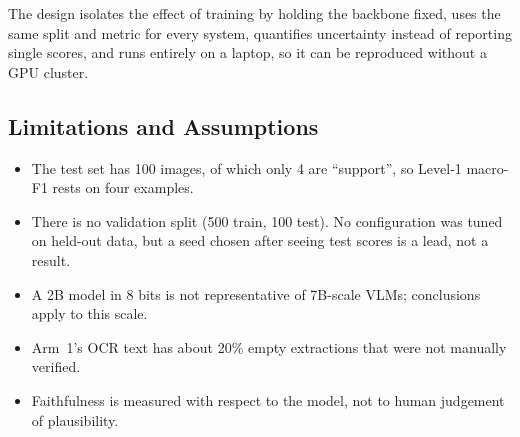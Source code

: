 The design isolates the effect of training by holding the backbone fixed, uses the same split and metric for every system, quantifies uncertainty instead of reporting single scores, and runs entirely on a laptop, so it can be reproduced without a GPU cluster.

\subsection{Limitations and Assumptions}

\begin{itemize}
    \item The test set has 100 images, of which only 4 are ``support'', so Level-1 macro-F1 rests on four examples.
    \item There is no validation split (500 train, 100 test). No configuration was tuned on held-out data, but a seed chosen after seeing test scores is a lead, not a result.
    \item A 2B model in 8 bits is not representative of 7B-scale VLMs; conclusions apply to this scale.
    \item Arm~1's OCR text has about 20\% empty extractions that were not manually verified.
    \item Faithfulness is measured with respect to the model, not to human judgement of plausibility.
\end{itemize}
